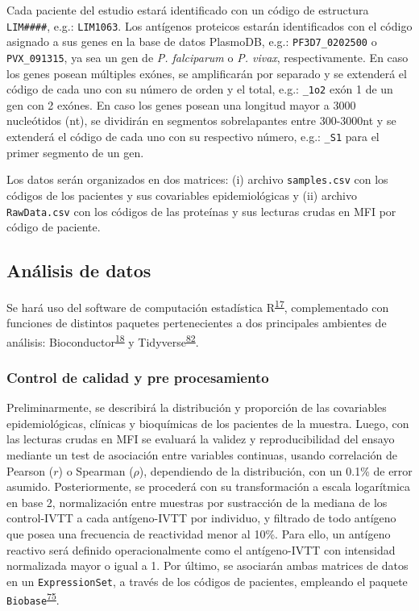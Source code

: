 \documentclass[]{article}
\begin{document}
Cada paciente del estudio estará identificado con un código de
estructura \texttt{LIM\#\#\#\#}, e.g.: \texttt{LIM1063}. Los antígenos
proteicos estarán identificados con el código asignado a sus genes en la
base de datos PlasmoDB, e.g.: \texttt{PF3D7\_0202500} o
\texttt{PVX\_091315}, ya sea un gen de \emph{P. falciparum} o \emph{P.
vivax}, respectivamente. En caso los genes posean múltiples exónes, se
amplificarán por separado y se extenderá el código de cada uno con su
número de orden y el total, e.g.: \texttt{\_1o2} exón 1 de un gen con 2
exónes. En caso los genes posean una longitud mayor a 3000 nucleótidos
(nt), se dividirán en segmentos sobrelapantes entre 300-3000nt y se
extenderá el código de cada uno con su respectivo número, e.g.:
\texttt{\_S1} para el primer segmento de un gen.

Los datos serán organizados en dos matrices: (i) archivo
\texttt{samples.csv} con los códigos de los pacientes y sus covariables
epidemiológicas y (ii) archivo \texttt{RawData.csv} con los códigos de
las proteínas y sus lecturas crudas en MFI por código de paciente.

\hypertarget{anadata}{\subsection{Análisis de datos}\label{anadata}}

Se hará uso del software de computación estadística
R\textsuperscript{\protect\hyperlink{ref-R2016}{17}}, complementado con
funciones de distintos paquetes pertenecientes a dos principales
ambientes de análisis:
Bioconductor\textsuperscript{\protect\hyperlink{ref-bioconductor2004}{18}}
y
Tidyverse\textsuperscript{\protect\hyperlink{ref-wickham2016r4ds}{82}}.

\subsubsection{Control de calidad y pre
procesamiento}\label{control-de-calidad-y-pre-procesamiento}

Preliminarmente, se describirá la distribución y proporción de las
covariables epidemiológicas, clínicas y bioquímicas de los pacientes de
la muestra. Luego, con las lecturas crudas en MFI se evaluará la validez
y reproducibilidad del ensayo mediante un test de asociación entre
variables continuas, usando correlación de Pearson (\(r\)) o Spearman
(\(\rho\)), dependiendo de la distribución, con un 0.1\% de error
asumido. Posteriormente, se procederá con su transformación a escala
logarítmica en base 2, normalización entre muestras por sustracción de
la mediana de los control-IVTT a cada antígeno-IVTT por individuo, y
filtrado de todo antígeno que posea una frecuencia de reactividad menor
al 10\%. Para ello, un antígeno reactivo será definido operacionalmente
como el antígeno-IVTT con intensidad normalizada mayor o igual a 1. Por
último, se asociarán ambas matrices de datos en un
\texttt{ExpressionSet}, a través de los códigos de pacientes, empleando
el paquete
\texttt{Biobase}\textsuperscript{\protect\hyperlink{ref-Biobase}{75}}.
\end{document}
